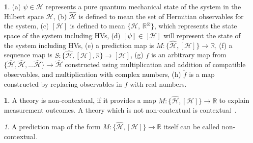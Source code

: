 \documentclass[british,aps,prl,superscriptaddress,nofootinbib,times,reprint]{revtex4-1}
\theoremstyle{plain}
\theoremstyle{plain}
\theoremstyle{definition}
\newtheorem{defn}{\protect\definitionname}
\theoremstyle{remark}
\theoremstyle{remark}
\newtheorem{defnrem}{\protect\remarkname}[defn]
\theoremstyle{remark}
\theoremstyle{plain}
\theoremstyle{plain}
\theoremstyle{plain}
\theoremstyle{definition}
\theoremstyle{definition}
\newtheorem*{notn*}{\protect\notationname}
\providecommand{\definitionname}{Definition}
\providecommand{\remarkname}{Remark}
\providecommand{\notationname}{Notation}
\begin{document}
\begin{notn*}
(a) $\psi\in\mathcal{H}$ represents a pure quantum
mechanical state of the system in the Hilbert
space $\mathcal{H}$, (b) $\hat{\mathcal{H}}$ is
defined to mean the set of Hermitian observables
for the system, (c) $[\mathcal{H}]$ is defined to
mean $\{\mathcal{H},\,\mathbb{R}^{\otimes}\}$, which
represents the state  space of the
system including HVs, (d) $[\psi]\in[\mathcal{H}]$
will represent the state of the system including
HVs, (e) a prediction map is $M:\{
\hat{\mathcal{H}},[\mathcal{H}] \}\to\mathbb{R}$,
(f) a sequence map is $S:\{
\hat{\mathcal{H}},[\mathcal{H}],\mathbb{R}
\}\to[\mathcal{H}]$, (g) $f$ is an arbitrary map
from $\{
\hat{\mathcal{H}},\hat{\mathcal{H}},\dots\hat{\mathcal{H}}
\} \to \hat{\mathcal{H}}$ constructed using
multiplication and addition of compatible
observables, and multiplication with complex
numbers, (h) $\tilde{f}$ is a map constructed by
replacing observables in $f$ with real numbers.
\end{notn*}
\begin{defn} A theory is non-contextual, if it
provides a map $M: \{
\hat{\mathcal{H}},[\mathcal{H}] \} \to\mathbb{R}$
to explain measurement outcomes. A theory which is
not non-contextual is contextual~\cite{peresBook}.
\end{defn}

\begin{defnrem}
A prediction map of the form {$M: \{
\hat{\mathcal{H}},[\mathcal{H}] \} \to\mathbb{R}$}
itself can be called  non-contextual.
\end{defnrem}
\end{document}
